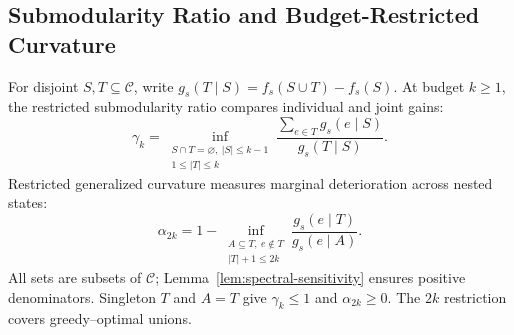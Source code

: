 \documentclass[conference]{IEEEtran}
\theoremstyle{definition}
\begin{document}
\subsection{Submodularity Ratio and Budget-Restricted Curvature}
For disjoint $S,T\subseteq\mathcal C$, write
$g_s(T\mid S)=f_s(S\cup T)-f_s(S)$. At budget $k\ge1$,
the restricted submodularity ratio compares individual and joint gains:
\begin{equation}
 \gamma_k=
 \inf_{\substack{S\cap T=\varnothing,\ |S|\leq k-1\\
                  1\leq |T|\leq k}}
 \frac{\sum_{e\in T}g_s(e\mid S)}{g_s(T\mid S)}.
 \label{eq:restricted-gamma}
\end{equation}
Restricted generalized curvature measures marginal deterioration
across nested states:
\begin{equation}
 \alpha_{2k}=1-
 \inf_{\substack{A\subseteq T,\ e\notin T\\ |T|+1\leq2k}}
 \frac{g_s(e\mid T)}{g_s(e\mid A)}.
 \label{eq:restricted-alpha}
\end{equation}
All sets are subsets of $\mathcal C$; Lemma~\ref{lem:spectral-sensitivity}
ensures positive denominators. Singleton $T$ and $A=T$ give
$\gamma_k\le1$ and $\alpha_{2k}\ge0$. The $2k$ restriction
covers greedy--optimal unions.
\end{document}
